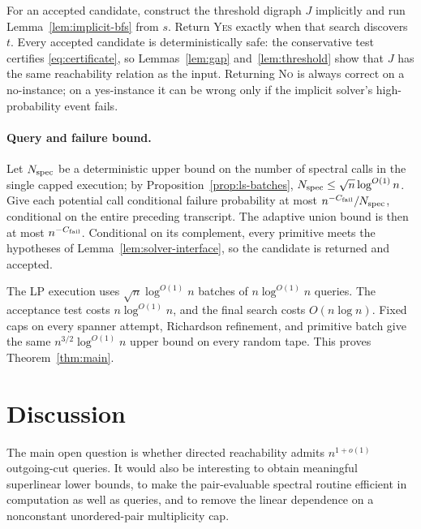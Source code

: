 \documentclass[11pt]{article}
\theoremstyle{definition}
\begin{document}
For an accepted candidate, construct the threshold digraph $J$ implicitly and
run Lemma~\ref{lem:implicit-bfs} from $s$.  Return \textsc{Yes} exactly when
that search discovers $t$.  Every accepted candidate is deterministically
safe: the conservative test certifies \eqref{eq:certificate}, so
Lemmas~\ref{lem:gap} and~\ref{lem:threshold} show that $J$ has the same
reachability relation as the input.  Returning \textsc{No} is always correct
on a no-instance; on a yes-instance it can be wrong only if the implicit
solver's high-probability event fails.

\paragraph{Query and failure bound.}
Let $N_{\rm spec}$ be a deterministic upper bound on the number of spectral
calls in the single capped execution; by
Proposition~\ref{prop:ls-batches},
$N_{\rm spec}\le\sqrt n\log^{O(1)}n$.  Give each potential call conditional
failure probability at most
$n^{-C_{\rm fail}}/N_{\rm spec}$, conditional on the entire preceding
transcript.  The adaptive union bound is then at most
$n^{-C_{\rm fail}}$.  Conditional on its complement, every primitive meets
the hypotheses of Lemma~\ref{lem:solver-interface}, so the candidate is
returned and accepted.

The LP execution uses $\sqrt n\log^{O(1)}n$ batches of
$n\log^{O(1)}n$ queries.  The acceptance test costs
$n\log^{O(1)}n$, and the final search costs $O(n\log n)$.  Fixed caps on every
spanner attempt, Richardson refinement, and primitive batch give the same
$n^{3/2}\log^{O(1)}n$ upper bound on every random tape.  This proves
Theorem~\ref{thm:main}.

\section{Discussion}

The main open question is whether directed reachability admits
$n^{1+o(1)}$ outgoing-cut queries.  It would also be interesting to obtain
meaningful superlinear lower bounds, to make the pair-evaluable spectral
routine efficient in computation as well as queries, and to remove the
linear dependence on a nonconstant unordered-pair multiplicity cap.
\end{document}
